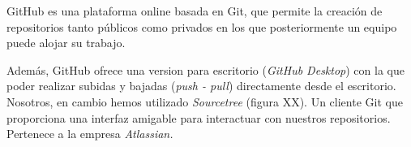 
GitHub es una plataforma online basada en Git, que permite la creación de repositorios tanto públicos como privados en los que posteriormente un equipo puede alojar su trabajo.

Además, GitHub ofrece una version para escritorio (\textit{GitHub Desktop}) con la que poder realizar subidas y bajadas (\textit{push - pull}) directamente desde el escritorio. Nosotros, en cambio hemos utilizado \textit{Sourcetree} (figura XX). Un cliente Git que proporciona una interfaz amigable para interactuar con nuestros repositorios. Pertenece a la empresa \textit{Atlassian.}

